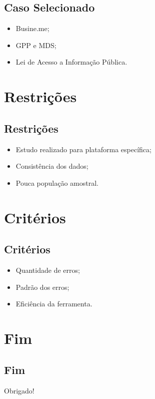 \documentclass{beamer}
\begin{document}
\subsection{Caso Selecionado}
\begin{frame}
  \begin{itemize}
      \item Busine.me;  
      \item GPP e MDS;
      \item Lei de Acesso a Informação Pública.
  \end{itemize}
\end{frame}

\section{Restrições} %
\subsection{Restrições}
\begin{frame}
  \begin{itemize}
      \item Estudo realizado para plataforma específica;  
      \item Consistência dos dados;
      \item Pouca população amostral.
  \end{itemize}
\end{frame}

\section{Critérios} %
\subsection{Critérios}
\begin{frame}
  \begin{itemize}
      \item Quantidade de erros;  
      \item Padrão dos erros;
      \item Eficiência da ferramenta.
  \end{itemize}
\end{frame}






\section{Fim}
\subsection{Fim}
\begin{frame}
\Huge{\centerline{Obrigado!}}
\end{frame}

\end{document}
